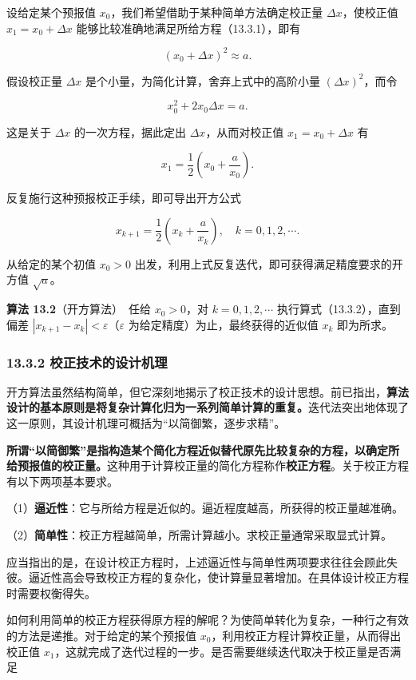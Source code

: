 \documentclass[
  10pt,
  fontset=fandol]{ctexart}
\begin{document}
设给定某个预报值 \(x_0\)，我们希望借助于某种简单方法确定校正量 \(\Delta x\)，使校正值 \(x_1=x_0+\Delta x\) 能够比较准确地满足所给方程（13.3.1），即有

\[
(x_0+\Delta x)^2\approx a.
\]

假设校正量 \(\Delta x\) 是个小量，为简化计算，舍弃上式中的高阶小量 \((\Delta x)^2\)，而令

\[
x_0^2+2x_0\Delta x=a.
\]

这是关于 \(\Delta x\) 的一次方程，据此定出 \(\Delta x\)，从而对校正值 \(x_1=x_0+\Delta x\) 有

\[
x_1=\frac{1}{2}\left(x_0+\frac{a}{x_0}\right).
\]

反复施行这种预报校正手续，即可导出开方公式

\[
x_{k+1}=\frac{1}{2}\left(x_k+\frac{a}{x_k}\right),\quad k=0,1,2,\cdots.
\tag{13.3.2}
\]

从给定的某个初值 \(x_0>0\) 出发，利用上式反复迭代，即可获得满足精度要求的开方值 \(\sqrt{a}\)。

\textbf{算法 13.2}（开方算法）　任给 \(x_0>0\)，对 \(k=0,1,2,\cdots\) 执行算式（13.3.2），直到偏差 \(|x_{k+1}-x_k|<\varepsilon\)（\(\varepsilon\) 为给定精度）为止，最终获得的近似值 \(x_k\) 即为所求。

\subsubsection{13.3.2 校正技术的设计机理}\label{ux6821ux6b63ux6280ux672fux7684ux8bbeux8ba1ux673aux7406}

开方算法虽然结构简单，但它深刻地揭示了校正技术的设计思想。前已指出，\textbf{算法设计的基本原则是将复杂计算化归为一系列简单计算的重复。}迭代法突出地体现了这一原则，其设计机理可概括为``以简御繁，逐步求精''。

\textbf{所谓``以简御繁''是指构造某个简化方程近似替代原先比较复杂的方程，以确定所给预报值的校正量。}这种用于计算校正量的简化方程称作\textbf{校正方程}。关于校正方程有以下两项基本要求。

（1）\textbf{逼近性}：它与所给方程是近似的。逼近程度越高，所获得的校正量越准确。

（2）\textbf{简单性}：校正方程越简单，所需计算越小。求校正量通常采取显式计算。

应当指出的是，在设计校正方程时，上述逼近性与简单性两项要求往往会顾此失彼。逼近性高会导致校正方程的复杂化，使计算量显著增加。在具体设计校正方程时需要权衡得失。

如何利用简单的校正方程获得原方程的解呢？为使简单转化为复杂，一种行之有效的方法是递推。对于给定的某个预报值 \(x_0\)，利用校正方程计算校正量，从而得出校正值 \(x_1\)，这就完成了迭代过程的一步。是否需要继续迭代取决于校正量是否满足
\end{document}

